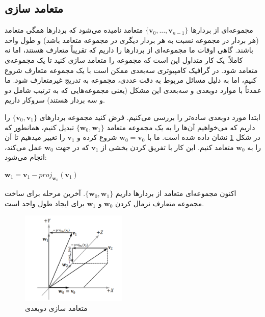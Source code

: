 \subsection{\textbf{متعامد سازی}}
\label{subsec:1.3.1}
{
    \Large
    \begin{spacing}{1.5}
        مجموعه‌ای از بردارها $\{\textbf{v}_{0},...,\textbf{v}_{n-1}\}$ متعامد نامیده می‌شود که بردارها همگی متعامد (هر بردار در مجموعه نسبت به هر بردار دیگری در مجموعه متعامد باشد) و طول واحد باشند.
        گاهی اوقات ما مجموعه‌ای از بردارها را داریم که تقریباً متعارف هستند، اما نه کاملاً.
        یک کار متداول این است که مجموعه را متعامد سازی کنید تا یک مجموعه‌ی متعامد شود.
        در گرافیک کامپیوتری سه‌بعدی ممکن است با یک مجموعه متعارف شروع کنیم، اما به دلیل مسائل مربوط به دقت عددی، مجموعه به تدریج غیرمتعارف شود.
        ما عمدتاً با موارد دو‌بعدی و سه‌بعدی این مشکل (یعنی مجموعه‌هایی که به ترتیب شامل دو و سه بردار هستند) سروکار داریم.

        ابتدا مورد دو‌بعدی ساده‌تر را بررسی می‌کنیم.
        فرض کنید مجموعه بردارهای $\{\textbf{v}_{0},\textbf{v}_{1}\}$ را داریم که می‌خواهیم آن‌ها را به یک مجموعه متعامد $\{\textbf{w}_{0},\textbf{w}_{1}\}$ تبدیل کنیم،
        همانطور که در شکل \ref{fig:4.Session.1.1.11} نشان داده شده است.
        ما با $\textbf{w}_{0}=\textbf{v}_{0}$ شروع کرده و $\textbf{v}_{1}$ را تغییر میدهیم تا آن را به $\textbf{w}_{0}$ متعامد کنیم.
        این کار با تفریق کردن بخشی از $\textbf{v}_{1}$ که در جهت $\textbf{w}_{0}$  عمل می‌کند، انجام می‌شود:

        \begin{center}
            $\textbf{w}_{1}=\textbf{v}_{1}-proj_{\textbf{w}_{0}}(\textbf{v}_{1})$
        \end{center}

        اکنون مجموعه‌ای متعامد از بردارها داریم $\{\textbf{w}_{0},\textbf{w}_{1}\}$.
        آخرین مرحله برای ساخت مجموعه متعارف نرمال کردن $\textbf{w}_{0}$ و $\textbf{w}_{1}$ برای ایجاد طول واحد است.

        \begin{figure}[H]
            \centering
            \setlength{\belowcaptionskip}{-10pt}
            \includegraphics[width=0.45\textwidth]{Images/4/1/4.Session.1.1.11}
            \caption{متعامد سازی دو‌بعدی}
            \label{fig:4.Session.1.1.11}
        \end{figure}


\end{spacing}}
